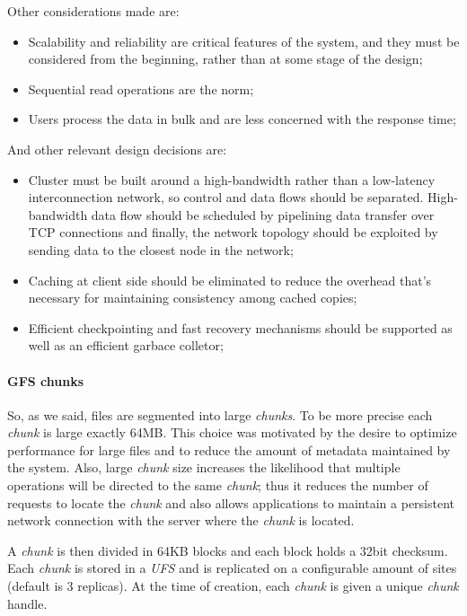 \noindent
Other considerations made are:
\begin{itemize}
    \item Scalability and reliability are critical features of the system, and
    they must be considered from the beginning, rather than at some stage of the
    design;
    \item Sequential read operations are the norm;
    \item Users process the data in bulk and are less concerned with the
    response time;
\end{itemize}
And other relevant design decisions are:
\begin{itemize}
    \item Cluster must be built around a high-bandwidth rather than a low-latency
    interconnection network, so control and data flows should be separated.
    High-bandwidth data flow should be scheduled by pipelining data transfer over
    TCP connections and finally, the network topology should be exploited by
    sending data to the closest node in the network;
    \item Caching at client side should be eliminated to reduce the overhead
    that's necessary for maintaining consistency among cached copies;
    \item Efficient checkpointing and fast recovery mechanisms should be
    supported as well as an efficient garbace colletor;
\end{itemize}

\paragraph{GFS chunks}
So, as we said, files are segmented into large \emph{chunks}. To be more precise
each \emph{chunk} is large exactly 64MB. This choice was motivated by the desire
to optimize performance for large files and to reduce the amount of metadata
maintained by the system. Also, large \emph{chunk} size increases the likelihood
that multiple operations will be directed to the same \emph{chunk}; thus it
reduces the number of requests to locate the \emph{chunk} and also allows
applications to maintain a persistent network connection with the server where
the \emph{chunk} is located.

A \emph{chunk} is then divided in 64KB blocks and each block holds a 32bit
checksum. Each \emph{chunk} is stored in a \emph{UFS} and is replicated on a
configurable amount of sites (default is 3 replicas). At the time of creation,
each \emph{chunk} is given a unique \emph{chunk} handle.


